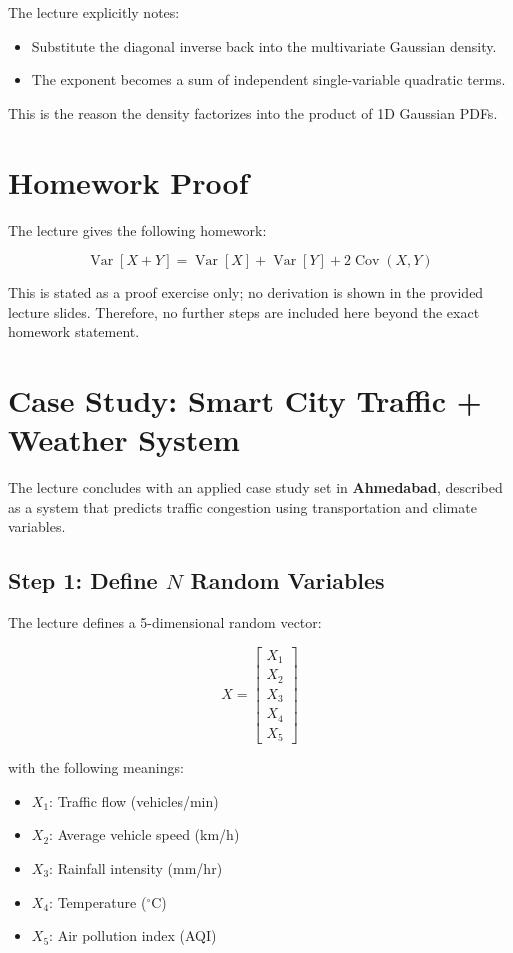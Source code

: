 \documentclass[12pt]{article}
\begin{document}
The lecture explicitly notes:

\begin{itemize}
    \item Substitute the diagonal inverse back into the multivariate Gaussian density.
    \item The exponent becomes a sum of independent single-variable quadratic terms.
\end{itemize}

This is the reason the density factorizes into the product of 1D Gaussian PDFs.

\section{Homework Proof}

The lecture gives the following homework:

\[
\boxed{\operatorname{Var}[X+Y] = \operatorname{Var}[X] + \operatorname{Var}[Y] + 2\operatorname{Cov}(X,Y)}
\]

This is stated as a proof exercise only; no derivation is shown in the provided lecture slides. Therefore, no further steps are included here beyond the exact homework statement.

\section{Case Study: Smart City Traffic + Weather System}

The lecture concludes with an applied case study set in \textbf{Ahmedabad}, described as a system that predicts traffic congestion using transportation and climate variables.

\subsection{Step 1: Define \(N\) Random Variables}

The lecture defines a 5-dimensional random vector:

\[
X =
\begin{bmatrix}
X_1 \\
X_2 \\
X_3 \\
X_4 \\
X_5
\end{bmatrix}
\]

with the following meanings:

\begin{itemize}
    \item \(X_1\): Traffic flow (vehicles/min)
    \item \(X_2\): Average vehicle speed (km/h)
    \item \(X_3\): Rainfall intensity (mm/hr)
    \item \(X_4\): Temperature (\(^\circ\)C)
    \item \(X_5\): Air pollution index (AQI)
\end{itemize}
\end{document}
